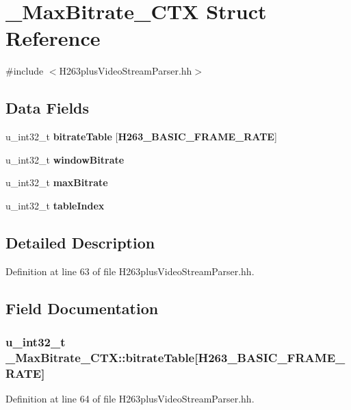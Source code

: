\section{\+\_\+\+Max\+Bitrate\+\_\+\+C\+T\+X Struct Reference}
\label{struct__MaxBitrate__CTX}


{\ttfamily \#include $<$H263plus\+Video\+Stream\+Parser.\+hh$>$}

\subsection*{Data Fields}
\begin{DoxyCompactItemize}
\item 
u\+\_\+int32\+\_\+t {\bf bitrate\+Table} [{\bf H263\+\_\+\+B\+A\+S\+I\+C\+\_\+\+F\+R\+A\+M\+E\+\_\+\+R\+A\+T\+E}]
\item 
u\+\_\+int32\+\_\+t {\bf window\+Bitrate}
\item 
u\+\_\+int32\+\_\+t {\bf max\+Bitrate}
\item 
u\+\_\+int32\+\_\+t {\bf table\+Index}
\end{DoxyCompactItemize}


\subsection{Detailed Description}


Definition at line 63 of file H263plus\+Video\+Stream\+Parser.\+hh.



\subsection{Field Documentation}
\subsubsection[{bitrate\+Table}]{\setlength{\rightskip}{0pt plus 5cm}u\+\_\+int32\+\_\+t \+\_\+\+Max\+Bitrate\+\_\+\+C\+T\+X\+::bitrate\+Table[{\bf H263\+\_\+\+B\+A\+S\+I\+C\+\_\+\+F\+R\+A\+M\+E\+\_\+\+R\+A\+T\+E}]}\label{struct__MaxBitrate__CTX_a1d4053336446915940e2bdd5c940cced}


Definition at line 64 of file H263plus\+Video\+Stream\+Parser.\+hh.

